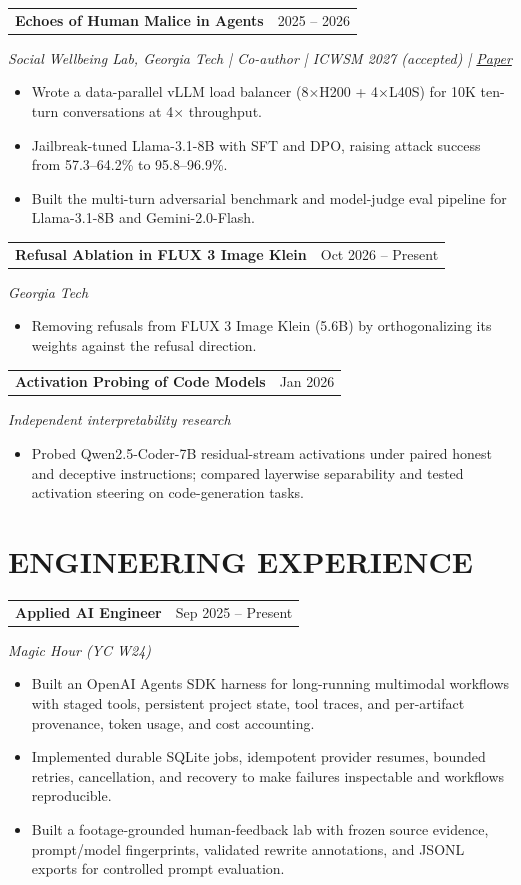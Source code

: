 \documentclass[10pt,letterpaper]{article}
\makeatletter
\newcommand{\entry}[3]{%
  \begin{tabularx}{\linewidth}{@{}X r@{}}\textbf{#1} & {\small #3}\end{tabularx}\par
  {\small\textit{#2}}\par\vspace{1pt}}
\makeatother
\begin{document}
\entry{Echoes of Human Malice in Agents}{Social Wellbeing Lab, Georgia Tech \enspace | \enspace Co-author \enspace | \enspace ICWSM 2027 (accepted) \enspace | \enspace \href{https://arxiv.org/abs/2510.14207}{Paper}}{2025 -- 2026}
\begin{itemize}
  \item Wrote a data-parallel vLLM load balancer (8$\times$H200 + 4$\times$L40S) for 10K ten-turn conversations at 4$\times$ throughput.
  \item Jailbreak-tuned Llama-3.1-8B with SFT and DPO, raising attack success from 57.3--64.2\% to 95.8--96.9\%.
  \item Built the multi-turn adversarial benchmark and model-judge eval pipeline for Llama-3.1-8B and Gemini-2.0-Flash.
\end{itemize}
\vspace{2pt}

\entry{Refusal Ablation in FLUX 3 Image Klein}{Georgia Tech}{Oct 2026 -- Present}
\begin{itemize}
  \item Removing refusals from FLUX 3 Image Klein (5.6B) by orthogonalizing its weights against the refusal direction.
\end{itemize}
\vspace{2pt}

\entry{Activation Probing of Code Models}{Independent interpretability research}{Jan 2026}
\begin{itemize}
  \item Probed Qwen2.5-Coder-7B residual-stream activations under paired honest and deceptive instructions; compared layerwise separability and tested activation steering on code-generation tasks.
\end{itemize}

\section*{ENGINEERING EXPERIENCE}
\entry{Applied AI Engineer}{Magic Hour (YC W24)}{Sep 2025 -- Present}
\begin{itemize}
  \item Built an OpenAI Agents SDK harness for long-running multimodal workflows with staged tools, persistent project state, tool traces, and per-artifact provenance, token usage, and cost accounting.
  \item Implemented durable SQLite jobs, idempotent provider resumes, bounded retries, cancellation, and recovery to make failures inspectable and workflows reproducible.
  \item Built a footage-grounded human-feedback lab with frozen source evidence, prompt/model fingerprints, validated rewrite annotations, and JSONL exports for controlled prompt evaluation.
\end{itemize}
\end{document}
